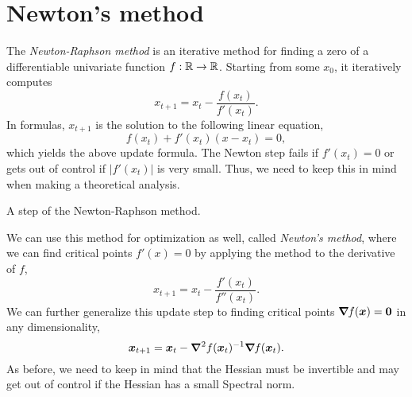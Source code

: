 \section{Newton's method}


The \textit{Newton-Raphson method} is an iterative method for finding a zero of a differentiable
univariate function $f: \mathbb{R} \to \mathbb{R}$. Starting from some $x_0$, it iteratively computes \[
    x_{t+1} = x_t - \frac{f(x_t)}{f'(x_t)}.
\]
In formulas, $x_{t+1}$ is the solution to the following linear equation, \[
    f(x_t) + f'(x_t) (x - x_t) = 0,
\]
which yields the above update formula. The Newton step fails if $f'(x_t) = 0$ or gets out of
control if $|f'(x_t)|$ is very small. Thus, we need to keep this in mind when making a theoretical
analysis.

\begin{marginfigure}
    \centering
    \caption{A step of the Newton-Raphson method.}
    \label{fig:newton-raphson}
\end{marginfigure}

We can use this method for optimization as well, called \textit{Newton's method}, where we can find
critical points $f'(x) = 0$ by applying the method to the derivative of $f$, \[
    x_{t+1} = x_t - \frac{f'(x_t)}{f''(x_t)}.
\]
We can further generalize this update step to finding critical points $\bm{\nabla}_{\! } f(\bm{x}) =
    \bm{0}$ in any dimensionality, \[
    \bm{x}_{t+1} = \bm{x}_t - \bm{\nabla}^2_{\! } f(\bm{x}_t)^{-1} \bm{\nabla}_{\! } f(\bm{x}_t).
\]
As before, we need to keep in mind that the Hessian must be invertible and may get out of control
if the Hessian has a small Spectral norm.

